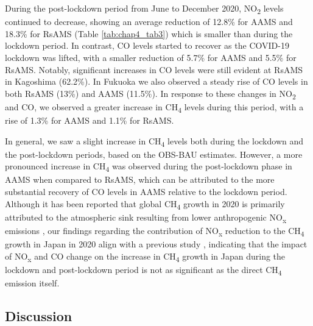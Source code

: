 During the post-lockdown period from June to December 2020, NO\textsubscript{2} levels continued to decrease, showing an average reduction of 12.8\% for AAMS and 18.3\% for RsAMS (Table \ref{tab:chap4_tab3}) which is smaller than during the lockdown period. In contrast, CO levels started to recover as the COVID-19 lockdown was lifted, with a smaller reduction of 5.7\% for AAMS and 5.5\% for RsAMS. Notably, significant increases in CO levels were still evident at RsAMS in Kagoshima (62.2\%). In Fukuoka we also observed a steady rise of CO levels in both RsAMS (13\%) and AAMS (11.5\%). In response to these changes in NO\textsubscript{2} and CO, we observed a greater increase in CH\textsubscript{4} levels during this period, with a rise of 1.3\% for AAMS and 1.1\% for RsAMS.\par
In general, we saw a slight increase in CH\textsubscript{4} levels both during the lockdown and the post-lockdown periods, based on the OBS-BAU estimates. However, a more pronounced increase in CH\textsubscript{4} was observed during the post-lockdown phase in AAMS when compared to RsAMS, which can be attributed to the more substantial recovery of CO levels in AAMS relative to the lockdown period. Although it has been reported that global CH\textsubscript{4} growth in 2020 is primarily attributed to the atmospheric sink resulting from lower anthropogenic NO\textsubscript{x} emissions \citep{stevenson2022covid,peng2022wetland}, our findings regarding the contribution of NO\textsubscript{x} reduction to the CH\textsubscript{4} growth in Japan in 2020 align with a previous study \citep{akimoto2022rethinking,qu2022attribution,feng2023methane}, indicating that the impact of NO\textsubscript{x} and CO change on the increase in CH\textsubscript{4} growth in Japan during the lockdown and post-lockdown period is not as significant as the direct CH\textsubscript{4} emission itself. \par

\subsection{Discussion} \label{chap4_disscussion}
